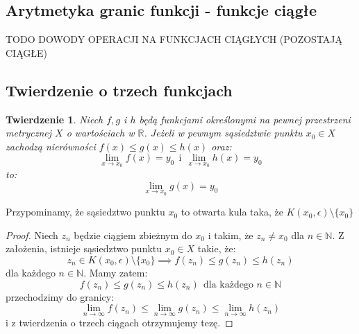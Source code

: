 \documentclass{article}
\newtheorem*{theorem}{Twierdzenie}
\begin{document}
\subsection{Arytmetyka granic funkcji - funkcje ciągłe}

\begin{center}
    TODO DOWODY OPERACJI NA FUNKCJACH CIĄGŁYCH (POZOSTAJĄ CIĄGŁE)
\end{center}

\subsection{Twierdzenie o trzech funkcjach}
\newpage
\begin{theorem}
    Niech \(f, g\) i \(h\) będą funkcjami określonymi na pewnej przestrzeni metrycznej \(X\) o
    wartościach w \(\mathbb{R}\). Jeżeli w pewnym sąsiedztwie punktu \(x_0 \in X\) zachodzą 
    nierówności \(f(x) \leq g(x) \leq h(x)\) oraz:
    \begin{equation*}
        \lim_{x \to x_0} f(x) = y_0 \ \ \mbox{i} \ \ \lim_{x \to x_0} h(x) = y_0 
    \end{equation*}
    to:
    \begin{equation*}
        \lim_{x \to x_0} g(x) = y_0
    \end{equation*}
\end{theorem}
Przypominamy, że sąsiedztwo punktu \(x_0\) to otwarta kula taka, że \(K(x_0, \epsilon) \setminus \{x_0\}\)
\begin{proof}
    Niech \(z_n\) będzie ciągiem zbieżnym do \(x_0\) i takim, że \(z_n \neq x_0\) dla \(n \in \mathbb{N}\).
    Z założenia, istnieje sąsiedztwo punktu \(x_0 \in X\) takie, że:
    \begin{equation*}
        z_n \in K(x_0, \epsilon) \setminus \{x_0\} \implies f(z_n) \leq g(z_n) \leq h(z_n)
    \end{equation*}
    dla każdego \(n \in \mathbb{N}\). Mamy zatem:
    \begin{equation*}
        f(z_n) \leq g(z_n) \leq h(z_n) \ \ \mbox{dla każdego \(n \in \mathbb{N}\)}
    \end{equation*}
    przechodzimy do granicy:
    \begin{equation*}
        \lim_{n \to \infty} f(z_n) \leq \lim_{n \to \infty} g(z_n) \leq \lim_{n \to \infty} h(z_n)
    \end{equation*}
    i z twierdzenia o trzech ciągach otrzymujemy tezę.
\end{proof}
\end{document}
